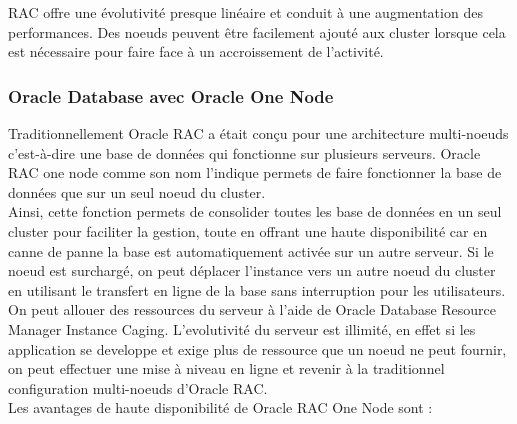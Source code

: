 \documentclass[12pt]{report}
\begin{document}
RAC offre une évolutivité presque linéaire et conduit à une augmentation des
performances. Des noeuds peuvent être facilement ajouté aux cluster lorsque cela
est nécessaire pour faire face à un accroissement de l'activité. \\

\subsubsection{Oracle Database avec Oracle One Node}

Traditionnellement Oracle RAC a était conçu pour une architecture multi-noeuds
c'est-à-dire une base de données qui fonctionne sur plusieurs serveurs. Oracle
RAC one node comme son nom l'indique permets de faire fonctionner la base de
données que sur un seul noeud du cluster.  \\

Ainsi, cette fonction permets de consolider toutes les base de données en un
seul cluster pour faciliter la gestion, toute en offrant une haute disponibilité
car en canne de panne la base est automatiquement activée sur un autre
serveur. Si le noeud est surchargé, on peut déplacer l'instance vers un autre
noeud du cluster en utilisant le transfert en ligne de la base sans interruption
pour les utilisateurs. \\


On peut allouer des ressources du serveur à l'aide de Oracle Database Resource
Manager Instance Caging. L'evolutivité du serveur est illimité, en effet si les
application se developpe et exige plus de ressource que un noeud ne peut
fournir, on peut effectuer une mise à niveau en ligne et revenir à la
traditionnel configuration multi-noeuds d'Oracle RAC. \\

Les avantages de haute disponibilité de Oracle RAC One Node sont : \\
\end{document}
